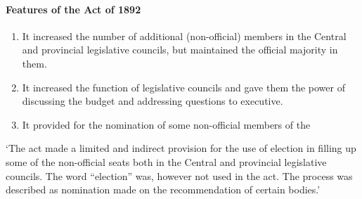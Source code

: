 \paragraph{Features of the Act of 1892}
\begin{enumerate}
  \item It increased the number of additional (non-official) members in the Central and provincial legislative councils, but maintained the official majority in them.
  \item It increased the function of legislative councils and gave them the power of discussing the budget and addressing questions to executive.
  \item It provided for the nomination of some non-official members of the
\end{enumerate}
`The act made a limited and indirect provision for the use of election in filling up some of the non-official seats both in the Central and provincial legislative councils. The word ``election'' was, however not used in the act. The process was described as nomination made on the recommendation of certain bodies.'

